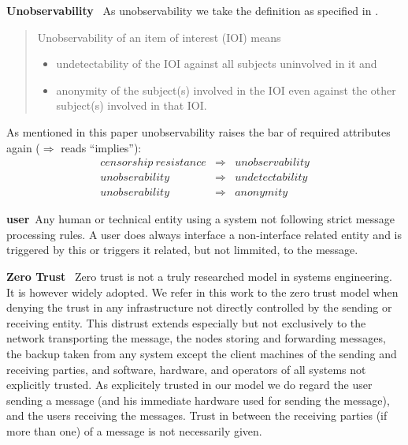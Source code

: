 \documentclass[a4paper,appendixprefix,pdfusetitle,twocolumn,draft,8pt]{scrbook}
\newenvironment{entry}{\par\leavevmode\hangpara{1.5mm}{1}\ignorespaces}{\RaggedRight\par}
\newcommand*{\mainentry}[2]{{\bfseries{#1\label{def:#1}}}~#2\par}
\begin{document}
\begin{entry}
	\mainentry{Unobservability}{
		As unobservability we take the definition as specified in \cite{anon_terminology}.
		\begin{quote}
			Unobservability of an item of interest (IOI) means
			\begin{itemize}
				\item undetectability of the IOI against all subjects uninvolved in it and
				\item anonymity of the subject(s) involved in the IOI even against the other subject(s) involved in that IOI.
			\end{itemize}
		\end{quote}		
		As mentioned in this paper unobservability raises the bar of required attributes again ($\Rightarrow$ reads ``implies''):
		\begin{eqnarray*}
			censorship\ resistance & \Rightarrow & unobservability\\
			unobserability         & \Rightarrow & undetectability\\
			unobserability         & \Rightarrow & anonymity
		\end{eqnarray*}
	}
\end{entry}


\begin{entry}
	\mainentry{user}{Any human or technical entity using a system not following strict message processing rules. A user does always interface a non-interface related entity and is triggered by this or triggers it related, but not limmited, to the message.}
\end{entry}

\begin{entry}
	\mainentry{Zero Trust}{
		Zero trust is not a truly researched model in systems engineering. It is however widely adopted. We refer in this work to the zero trust model when denying the trust in any infrastructure not directly controlled by the sending or receiving entity. This distrust extends especially but not exclusively to the network transporting the message, the nodes storing and forwarding messages, the backup taken from any system except the client machines of the sending and receiving parties, and software, hardware, and operators of all systems not explicitly trusted. As explicitely trusted in our model we do regard the user sending a message (and his immediate hardware used for sending the message), and the users receiving the messages. Trust in between the receiving parties (if more than one) of a message is not necessarily given.
	}
\end{entry}		
\end{document}
